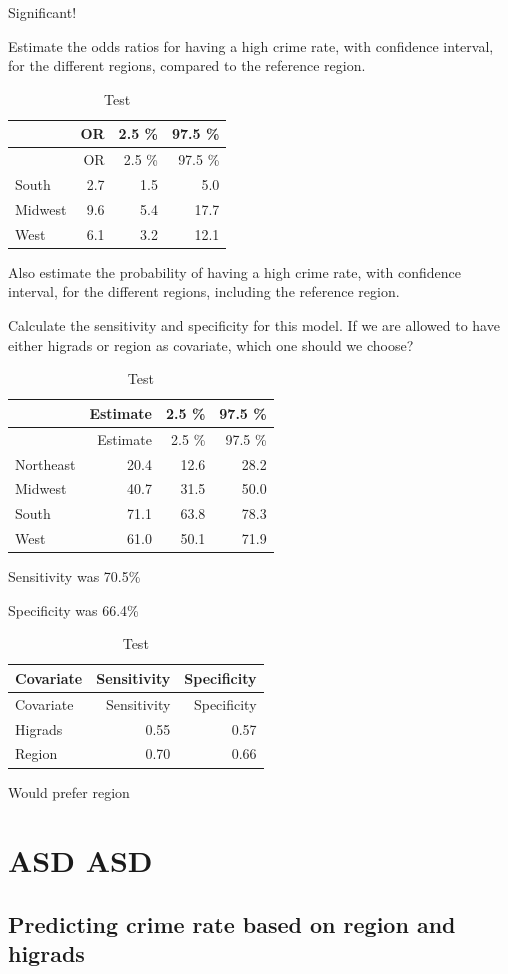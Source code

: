 \documentclass[a4paper]{article}
\begin{document}
Significant!

Estimate the odds ratios for having a high crime rate, with confidence
interval, for the different regions, compared to the reference region.

\begin{longtable}[]{@{}lrrr@{}}
\caption{Test}\tabularnewline
\toprule
& OR & 2.5 \% & 97.5 \%\tabularnewline
\midrule
\endfirsthead
\toprule
& OR & 2.5 \% & 97.5 \%\tabularnewline
\midrule
\endhead
South & 2.7 & 1.5 & 5.0\tabularnewline
Midwest & 9.6 & 5.4 & 17.7\tabularnewline
West & 6.1 & 3.2 & 12.1\tabularnewline
\bottomrule
\end{longtable}

Also estimate the probability of having a high crime rate, with
confidence interval, for the different regions, including the reference
region.

Calculate the sensitivity and specificity for this model. If we are
allowed to have either higrads or region as covariate, which one should
we choose?

\begin{longtable}[]{@{}lrrr@{}}
\caption{Test}\tabularnewline
\toprule
& Estimate & 2.5 \% & 97.5 \%\tabularnewline
\midrule
\endfirsthead
\toprule
& Estimate & 2.5 \% & 97.5 \%\tabularnewline
\midrule
\endhead
Northeast & 20.4 & 12.6 & 28.2\tabularnewline
Midwest & 40.7 & 31.5 & 50.0\tabularnewline
South & 71.1 & 63.8 & 78.3\tabularnewline
West & 61.0 & 50.1 & 71.9\tabularnewline
\bottomrule
\end{longtable}

Sensitivity was 70.5\%

Specificity was 66.4\%

\begin{longtable}[]{@{}lrr@{}}
\caption{Test}\tabularnewline
\toprule
Covariate & Sensitivity & Specificity\tabularnewline
\midrule
\endfirsthead
\toprule
Covariate & Sensitivity & Specificity\tabularnewline
\midrule
\endhead
Higrads & 0.55 & 0.57\tabularnewline
Region & 0.70 & 0.66\tabularnewline
\bottomrule
\end{longtable}

Would prefer region

\section{ASD ASD}\label{asd-asd}

\subsection{Predicting crime rate based on region and
higrads}\label{predicting-crime-rate-based-on-region-and-higrads}
\end{document}

